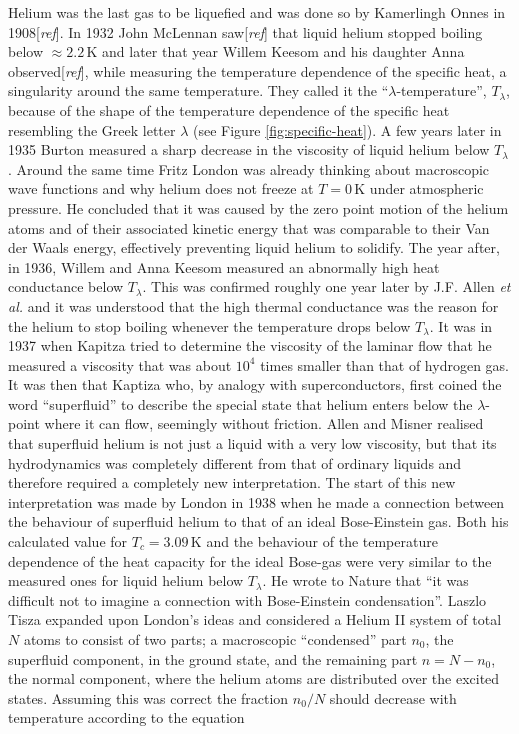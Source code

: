 \documentclass[11pt,a4paper,twoside]{article}
\newcommand{\unit}[1]{\,\mathrm{#1}}
\begin{document}
	Helium was the last gas to be liquefied and was done so by Kamerlingh Onnes in 1908[\emph{ref}]. In 1932 John McLennan saw[\emph{ref}] that liquid helium stopped boiling below $\approx2.2\unit{K}$ and later that year Willem Keesom and his daughter Anna observed[\emph{ref}], while measuring  the temperature dependence of the specific heat, a singularity around the same temperature. They called it the ``$\lambda$-temperature'',  $T_\lambda$, because of the shape of the temperature dependence of the specific heat resembling the Greek letter $\lambda$ (see Figure \ref{fig:specific-heat}). A few years later in 1935 Burton measured a sharp decrease in the viscosity of liquid helium below $T_\lambda$. Around the same time Fritz London was already thinking about macroscopic wave functions and why helium does not freeze at $T=0\unit{K}$ under atmospheric pressure. He concluded that it was caused by the zero point motion of the helium atoms and of their associated kinetic energy that was comparable to their Van der Waals energy, effectively preventing liquid helium to solidify. The year after, in 1936, Willem and Anna Keesom measured an abnormally high heat conductance below $T_\lambda$. This was confirmed roughly one year later by J.F. Allen \emph{et al.} and it was understood that the high thermal conductance was the reason for the helium to stop boiling whenever the temperature drops below $T_\lambda$. It was in 1937 when Kapitza tried to determine the viscosity of the laminar flow that he measured a viscosity that was about $10^4$ times smaller than that of hydrogen gas. It was then that Kaptiza who, by analogy with superconductors, first coined the word ``superfluid'' to describe the special state that helium enters below the $\lambda$-point where it can flow, seemingly without friction. Allen and Misner realised that superfluid helium is not just a liquid with a very low viscosity, but that its hydrodynamics was completely different from that of ordinary liquids and therefore required a completely new interpretation. The start of this new interpretation was made by London in 1938 when he made a connection between the behaviour of superfluid helium to that of an ideal Bose-Einstein gas. Both his calculated value for $T_c=3.09\unit{K}$ and the behaviour of the temperature dependence of the heat capacity for the ideal Bose-gas were very similar to the measured ones for liquid helium below $T_\lambda$. He wrote to Nature that ``it was difficult not to imagine a connection with Bose-Einstein condensation''. Laszlo Tisza expanded upon London's ideas and considered a Helium II system of total $N$ atoms to consist of two parts; a macroscopic ``condensed'' part $n_0$, the superfluid component, in the ground state, and the remaining part $n=N-n_0$, the normal component, where the helium atoms are distributed over the excited states. Assuming this was correct the fraction $n_0/N$ should decrease with temperature according to the equation
\end{document}

